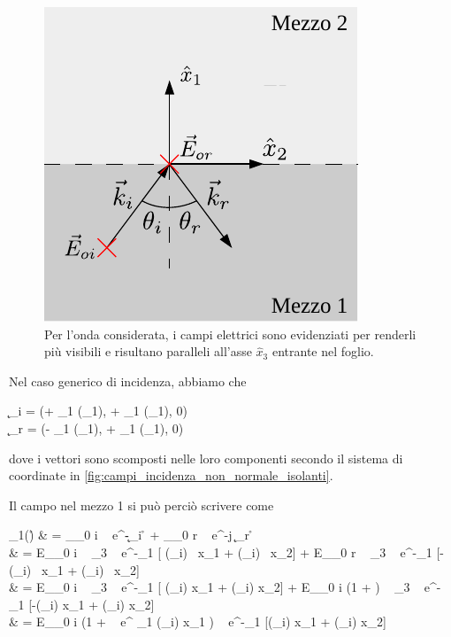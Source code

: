 	\begin{figure}[ht]
		\centering
		\includegraphics{img/campi_incidenza_non_normale.pdf}
		 \caption{Per l'onda considerata, i campi elettrici sono evidenziati per renderli più visibili e risultano paralleli all'asse $\hat{x}_3$ entrante nel foglio.}
		\label{fig:campi_incidenza_non_normale_isolanti}
	\end{figure}

	Nel caso generico di incidenza, abbiamo che
	\begin{esp}
		\begin{dcases}
			\k_i = (+ \beta_1 \cos(\theta_1), + \beta_1 \sin(\theta_1), 0) \\
			\k_r = (- \beta_1 \cos(\theta_1), + \beta_1 \sin(\theta_1), 0)
		\end{dcases}
	\end{esp}
	dove i vettori sono scomposti nelle loro componenti secondo il sistema di coordinate in \autoref{fig:campi_incidenza_non_normale_isolanti}.

	Il campo nel mezzo 1 si può perciò scrivere come
	\begin{esp}
		\E_1(\r)
		& = \E_{_0 i} ~ e^{-\jmath \k_i \cdot \r} + \E_{_0 r} ~ e^{-j \k_r \cdot \r} \\
		& = E_{_0 i} ~ \hat{x}_3
			~ e^{-\jmath \beta_1 [ \cos(\theta_i) \, x_1 + \sin(\theta_i) \, x_2] }
			+ E_{_0 r} ~ \hat{x}_3
			~ e^{-\jmath \beta_1 [-\cos(\theta_i) \, x_1 + \sin(\theta_i) \, x_2] } \\
		& = E_{_0 i} ~ \hat{x}_3
			~ e^{-\jmath \beta_1 [ \cos(\theta_i) x_1 + \sin(\theta_i) x_2] }
			+ E_{_0 i} (1 + \rho)
			~ _3 ~ e^{-\jmath \beta_1 [-\cos(\theta_i) x_1 + \sin(\theta_i) x_2]} \\
		& = E_{_0 i} (1 + \rho ~ e^{ \beta_1 \cos(\theta_i) x_1} )
			~ e^{-\jmath \beta_1 [\cos(\theta_i) x_1 + \sin(\theta_i) x_2]} \\
	\end{esp}

